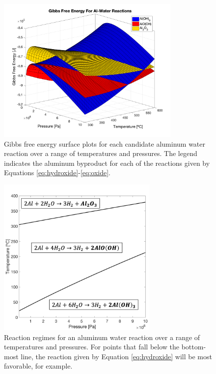 \documentclass[preprint,12pt,3p]{elsarticle}
\begin{document}
\begin{figure}
  \centering
  \includegraphics[width=0.8\textwidth]{fig/gibbs_total_surface}
  \caption{Gibbs free energy surface plots for each candidate aluminum water
  reaction over a range of temperatures and pressures. The legend indicates the
  aluminum byproduct for each of the reactions given by Equations
\ref{eq:hydroxide}-\ref{eq:oxide}.}
  \label{fig:gibbs_surface}
\end{figure}

\begin{figure}
  \centering
  \includegraphics[width=0.7\textwidth]{fig/transitions}
  \caption{Reaction regimes for an aluminum water reaction over a range of
  temperatures and pressures. For points that fall below the bottom-most line,
the reaction given by Equation \ref{eq:hydroxide} will be most favorable, for
example.}
  \label{fig:transitions}
\end{figure}
\end{document}
